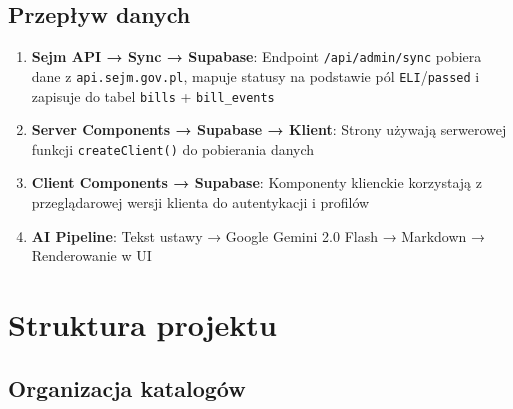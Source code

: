 \documentclass[12pt,a4paper]{article}
\begin{document}
\subsection{Przepływ danych}

\begin{enumerate}[leftmargin=2em]
  \item \textbf{Sejm API → Sync → Supabase}: Endpoint \texttt{/api/admin/sync} pobiera dane z \texttt{api.sejm.gov.pl}, mapuje statusy na podstawie pól \texttt{ELI}/\texttt{passed} i zapisuje do tabel \texttt{bills} + \texttt{bill\_events}
  \item \textbf{Server Components → Supabase → Klient}: Strony używają serwerowej funkcji \texttt{createClient()} do pobierania danych
  \item \textbf{Client Components → Supabase}: Komponenty klienckie korzystają z przeglądarowej wersji klienta do autentykacji i profilów
  \item \textbf{AI Pipeline}: Tekst ustawy → Google Gemini 2.0 Flash → Markdown → Renderowanie w UI
\end{enumerate}

\newpage

\section{Struktura projektu}

\subsection{Organizacja katalogów}
\end{document}
